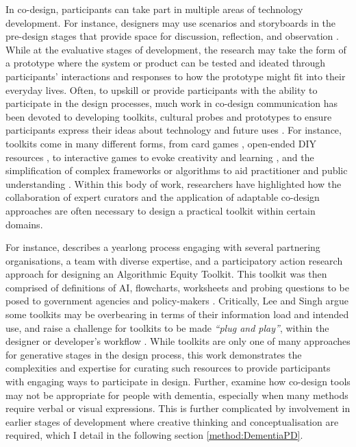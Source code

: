 In co-design, participants can take part in multiple areas of technology development. For instance, designers may use scenarios and storyboards in the pre-design stages that provide space for discussion, reflection, and observation \citep{bell2019collaborative}. While at the evaluative stages of development, the research may take the form of a prototype where the system or product can be tested and ideated through participants' interactions and responses to how the prototype might fit into their everyday lives. Often, to upskill or provide participants with the ability to participate in the design processes, much work in co-design communication has been devoted to developing toolkits, cultural probes and prototypes to ensure participants express their ideas about technology and future uses \citep{medina_angarita_what_2020}. For instance, toolkits come in many different forms, from card games \citep{logler2018metaphor}, open-ended DIY resources \citep{meissner2018schnittmuster}, to interactive games to evoke creativity and learning \citep{ellis2021tapeblocks}, and the simplification of complex frameworks or algorithms to aid practitioner and public understanding \citep{krafft2021action}. Within this body of work, researchers have highlighted how the collaboration of expert curators and the application of adaptable co-design approaches are often necessary to design a practical toolkit within certain domains. 

For instance, \citep{krafft2021action} describes a yearlong process engaging with several partnering organisations, a team with diverse expertise, and a participatory action research approach for designing an Algorithmic Equity Toolkit. This toolkit was then comprised of definitions of AI, flowcharts, worksheets and probing questions to be posed to government agencies and policy-makers \citep{katell2020toward}. Critically, Lee and Singh argue some toolkits may be overbearing in terms of their information load and intended use, and raise a challenge for toolkits to be made \textit{``plug and play''}, within the designer or developer's workflow \citep{lee2021landscape}. While toolkits are only one of many approaches for generative stages in the design process, this work demonstrates the complexities and expertise for curating such resources to provide participants with engaging ways to participate in design. Further, \cite{hendriks_challenges_2014} examine how co-design tools may not be appropriate for people with dementia, especially when many methods require verbal or visual expressions. This is further complicated by involvement in earlier stages of development where creative thinking and conceptualisation are required, which I detail in the following section \ref{method:DementiaPD}.

